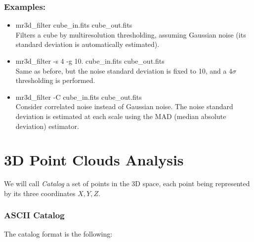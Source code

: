\subsubsection*{Examples:}
\begin{itemize}
\item mr3d\_filter cube\_in.fits cube\_out.fits \\
Filters a cube by multiresolution  thresholding, assuming
Gaussian noise (its standard deviation is automatically estimated).
\item mr3d\_filter -s 4 -g 10. cube\_in.fits cube\_out.fits \\
Same as before, but the noise standard deviation is fixed to 10, and
a  $4\sigma$ thresholding is performed. 
\item mr3d\_filter -C cube\_in.fits cube\_out.fits \\
Consider correlated noise instead of Gaussian noise. The noise standard
deviation is estimated at each scale using the MAD (median absolute
deviation) estimator.
\end{itemize}


\newpage

\section{3D Point Clouds Analysis}
We will call {\em Catalog} a set of points in the 3D space, each point 
being represented by its three coordinates $X,Y,Z$.

\subsubsection*{ASCII Catalog}
The catalog format is the following: 
